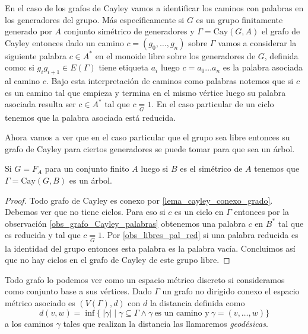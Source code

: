 \documentclass[tesis.tex]{subfiles}
\begin{document}
\begin{obs}\label{obs_grafo_Cayley_palabras}
	
En el caso de los grafos de Cayley vamos a identificar los caminos con palabras en los generadores del grupo.
Más específicamente si $G$ es un grupo finitamente generado por $A$ conjunto simétrico de generadores y $\Gamma = \text{Cay}(G,A)$ el grafo de Cayley entonces dado un camino $c = (g_{0}, \dots, g_{n})$ sobre $\Gamma$ vamos a considerar la siguiente palabra $c \in A^{*}$ en el monoide libre sobre los generadores de $G$, definida como:
si $g_{i}g_{i+1} \in E(\Gamma)$ tiene etiqueta $a_{i}$ luego $c = a_{0}\dots a_{n}$ es la palabra asociada al camino $c$.
Bajo esta interpretación de caminos como palabras notemos que si $c$ es un camino tal que empieza y termina en el mismo vértice luego su palabra asociada resulta ser $c \in A^*$ tal que $c \underset{G}{=} 1$.
En el caso particular de un ciclo tenemos que la palabra asociada está reducida.
\end{obs}

Ahora vamos a ver que en el caso particular que el grupo sea libre entonces su grafo de Cayley para ciertos generadores se puede tomar para que sea un árbol.

\begin{lema}\label{lema_cayley_libre_arbol}
	Si $G = F_{A}$ para un conjunto finito $A$ luego si $B$ es el simétrico de $A$ tenemos que $\Gamma = \text{Cay}(G,B)$ es un árbol.
\end{lema}

\begin{proof}
	Todo grafo de Cayley es conexo por \ref{lema_cayley_conexo_grado}.
	Debemos ver que no tiene ciclos.
	Para eso si $c$ es un ciclo en $\Gamma$ entonces por la observación \ref{obs_grafo_Cayley_palabras} obtenemos una palabra $c$ en $B^*$ tal que es {reducida} y tal que $c \underset{G}{=} 1$.
	Por \ref{obs_libres_pal_red} si una palabra reducida es la identidad del grupo entonces esta palabra es la palabra vacía.
	Concluimos así que no hay ciclos en el grafo de Cayley de este grupo libre.
	
\end{proof}


Todo grafo lo podemos ver como un espacio métrico discreto si consideramos como conjunto base a sus vértices. 
Dado $\Gamma$ un grafo no dirigido conexo el espacio métrico asociado es 
$ (V(\Gamma), d )$ con $d$ la distancia definida como 
\[
	d(v,w) = \inf \{ \  |\gamma|  \mid \gamma \subseteq \Gamma \land \gamma \ \text{es un camino y} \ 
	\gamma=(v,\dots, w)  \}
\] 
a los caminos $\gamma$ tales que realizan la distancia las llamaremos \emph{geodésicas}.
\end{document}
